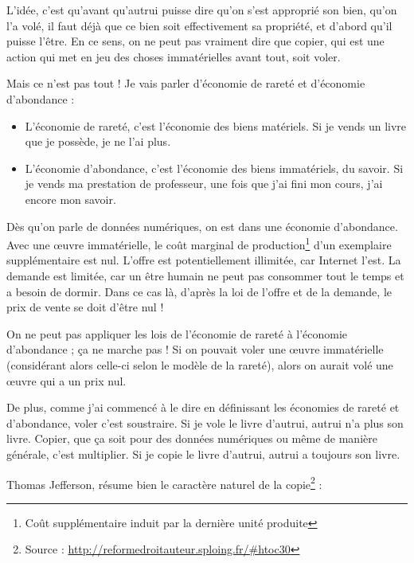 L'idée, c'est qu'avant qu'autrui puisse dire qu'on s'est approprié son bien, qu'on l'a volé, il faut déjà que ce bien soit effectivement sa propriété, et d'abord qu'il puisse l'être.
En ce sens, on ne peut pas vraiment dire que copier, qui est une action qui met en jeu des choses immatérielles avant tout, soit voler.

Mais ce n'est pas tout !
Je vais parler d'économie de rareté et d'économie d'abondance :

\begin{itemize}
\item L'économie de rareté, c'est l'économie des biens matériels.
Si je vends un livre que je possède, je ne l'ai plus.
\item L'économie d'abondance, c'est l'économie des biens immatériels, du savoir.
Si je vends ma prestation de professeur, une fois que j'ai fini mon cours, j'ai encore mon savoir.
\end{itemize}

Dès qu'on parle de données numériques, on est dans une économie d'abondance.
Avec une œuvre immatérielle, le coût marginal de production\footnote{Coût supplémentaire induit par la dernière unité produite} d'un exemplaire supplémentaire est nul.
L'offre est potentiellement illimitée, car Internet l'est.
La demande est limitée, car un être humain ne peut pas consommer tout le temps et a besoin de dormir.
Dans ce cas là, d'après la loi de l'offre et de la demande, le prix de vente se doit d'être nul !

On ne peut pas appliquer les lois de l'économie de rareté à l'économie d'abondance ; ça ne marche pas !
Si on pouvait voler une œuvre immatérielle (considérant alors celle-ci selon le modèle de la rareté), alors on aurait volé une œuvre qui a un prix nul.

De plus, comme j'ai commencé à le dire en définissant les économies de rareté et d'abondance, voler c'est soustraire.
Si je vole le livre d'autrui, autrui n'a plus son livre.
Copier, que ça soit pour des données numériques ou même de manière générale, c'est multiplier.
Si je copie le livre d'autrui, autrui a toujours son livre.

Thomas Jefferson, résume bien le caractère naturel de la copie\footnote{Source : \url{http://reformedroitauteur.sploing.fr/\#htoc30}} :

